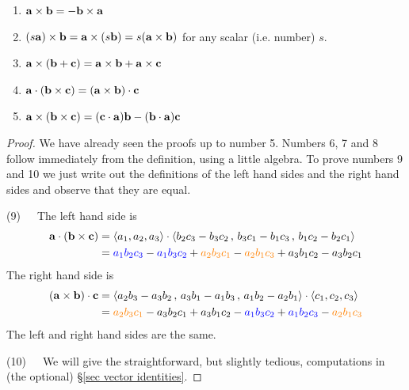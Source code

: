 \begin{theorem}
\begin{enumerate}[(1)]
\item $\mathbf{a}\times \mathbf{b}=-\mathbf{b}\times\mathbf{a}$

\item $(s\mathbf{a})\times \mathbf{b}=\mathbf{a}\times(s\mathbf{b})=s(\mathbf{a}\times \mathbf{b})$ for any scalar
(i.e. number) $s$.

\item $\mathbf{a}\times(\mathbf{b}+\mathbf{c})=\mathbf{a}\times\mathbf{b}+\mathbf{a}\times \mathbf{c}$

\item $\mathbf{a}\cdot(\mathbf{b}\times\mathbf{c})=(\mathbf{a}\times\mathbf{b})\cdot\mathbf{c}$

\item $\mathbf{a}\times(\mathbf{b}\times\mathbf{c})=(\mathbf{c}\cdot\mathbf{a})\mathbf{b} -(\mathbf{b}\cdot\mathbf{a})\mathbf{c}$
\end{enumerate}

\end{theorem}
\begin{proof}
We have already seen the proofs up to number 5. Numbers 6, 7 and 8 
follow immediately from the definition, using a little algebra. To prove 
numbers 9 and 10 we just write out the definitions of the left hand sides 
and the right hand sides and observe that they are equal.

\medskip
\noindent (9)\ \ \ The left hand side is
\begin{align*}
\mathbf{a}\cdot(\mathbf{b}\times\mathbf{c})
&=\left< a_1,a_2,a_3\right>\cdot
      \left< b_2c_3-b_3c_2\,,\, b_3c_1-b_1c_3\,,\, b_1c_2-b_2c_1\right>\\
&=\textcolor{blue}{a_1b_2c_3} - \textcolor{blue}{a_1b_3c_2} 
    + \textcolor{orange}{a_2b_3c_1} - \textcolor{orange}{a_2b_1c_3} 
    + a_3b_1c_2 - a_3b_2c_1
\end{align*}
The right hand side is
\begin{align*}
(\mathbf{a}\times\mathbf{b})\cdot\mathbf{c}
&=\left< a_2b_3-a_3b_2\,,\, a_3b_1-a_1b_3\,,\, a_1b_2-a_2b_1\right>\cdot
       \left< c_1,c_2,c_3\right> \\
&=\textcolor{orange}{a_2b_3c_1} - a_3b_2c_1 + a_3b_1c_2 
- \textcolor{blue}{a_1b_3c_2} + \textcolor{blue}{a_1b_2c_3} 
- \textcolor{orange}{a_2b_1c_3}
\end{align*}
The left and right hand sides are the same.

\medskip
\noindent (10)\ \ \ We will give the straightforward, but slightly tedious,
computations in (the optional) \S\ref{sec vector identities}.
 \end{proof}


